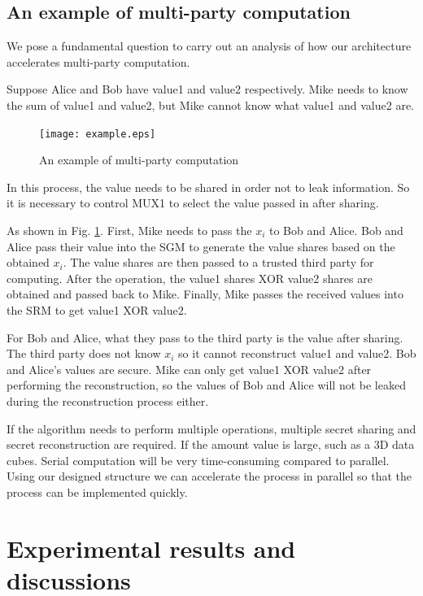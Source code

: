 \subsection{An example of multi-party computation}\label{subsec42}

We pose a fundamental question to carry out an analysis of how our architecture accelerates multi-party computation.

Suppose Alice and Bob have value1 and value2 respectively. Mike needs to know the sum of value1 and value2, but Mike cannot know what value1 and value2 are.

\begin{figure}[!htb]
	\begin{center}
		\texttt{[image: example.eps]}\\
		\caption{An example of multi-party computation}
		\label{fig13}
		\vspace{-2.0em}
	\end{center}
\end{figure}

In this process, the value needs to be shared in order not to leak information. So it is necessary to control MUX1 to select the value passed in after sharing.

As shown in Fig. \ref{fig13}. First, Mike needs to pass the $x_{i}$ to Bob and Alice. Bob and Alice pass their value into the SGM to generate the value shares based on the obtained $x_{i}$. The value shares are then passed to a trusted third party for computing. After the operation, the value1 shares XOR value2 shares are obtained and passed back to Mike. Finally, Mike passes the received values into the SRM to get value1 XOR value2. 

For Bob and Alice, what they pass to the third party is the value after sharing. The third party does not know $x_{i}$ so it cannot reconstruct value1 and value2. Bob and Alice's values are secure. {\color{red}Mike can only get value1 XOR value2 after performing the reconstruction, so the values of Bob and Alice will not be leaked during the reconstruction process either.}

If the algorithm needs to perform multiple operations, multiple secret sharing and secret reconstruction are required. If the amount value is large, such as a 3D data cubes. Serial computation will be very time-consuming compared to parallel. Using our designed structure we can accelerate the process in parallel so that the process can be implemented quickly.

\section{Experimental results and discussions}\label{Sec_experiments}

